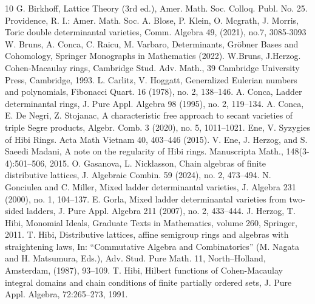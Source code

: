 \documentclass[12pt]{amsart}
\numberwithin{equation}{section}
\theoremstyle{definition}
\begin{document}
\begin{thebibliography}{10} 
 G. Birkhoff, Lattice Theory (3rd ed.), Amer. Math. Soc. Colloq. Publ. No. 25. Providence, R. I.: Amer. Math. Soc.
 A. Blose, P. Klein, O. Mcgrath, J. Morris,
Toric double determinantal varieties, Comm. Algebra 49, (2021), no.7, 3085-3093
 W. Bruns, A. Conca, C. Raicu, M. Varbaro, Determinants, Gröbner Bases and Cohomology, Springer Monographs in Mathematics (2022).
  W.Bruns, J.Herzog. Cohen-Macaulay rings, Cambridge Stud. Adv. Math., 39
Cambridge University Press, Cambridge, 1993.
 L. Carlitz, V. Hoggatt, Generalized Eulerian numbers and polynomials, Fibonacci Quart. 16 (1978), no. 2, 138–146.
 A. Conca, Ladder determinantal rings, J. Pure Appl. Algebra 98 (1995), no. 2, 119–134.
 A. Conca, E. De Negri, Z. Stojanac, A characteristic free approach to secant varieties of triple Segre products, Algebr. Comb. 3 (2020), no. 5, 1011–1021.
 Ene, V. Syzygies of Hibi Rings. Acta Math Vietnam 40, 403–446 (2015).
 V. Ene, J. Herzog, and S. Saeedi Madani, A note on the regularity of Hibi rings. Manuscripta Math., 148(3-4):501–506, 2015.
  O. Gasanova, L. Nicklasson, Chain algebras of finite distributive lattices, J. Algebraic Combin. 59 (2024), no. 2, 473–494.
 N. Gonciulea and C. Miller, Mixed ladder determinantal varieties, J. Algebra 231 (2000), no. 1, 104–137.
 E. Gorla, Mixed ladder determinantal varieties from two-sided ladders, J. Pure Appl. Algebra 211 (2007), no. 2, 433–444.
 J. Herzog, T. Hibi, Monomial Ideals,  Graduate Texts in Mathematics, volume 260, Springer, 2011. 
 T. Hibi, Distributive lattices, affine semigroup rings and algebras with straightening laws, In: “Commutative Algebra and Combinatorics” (M. Nagata and H. Matsumura, Eds.), Adv. Stud. Pure Math. 11, North–Holland, Amsterdam, (1987), 93–109.
 T. Hibi, Hilbert functions of Cohen-Macaulay integral domains and chain conditions of finite
partially ordered sets, J. Pure Appl. Algebra, 72:265–273, 1991.



\end{thebibliography}
\end{document}
